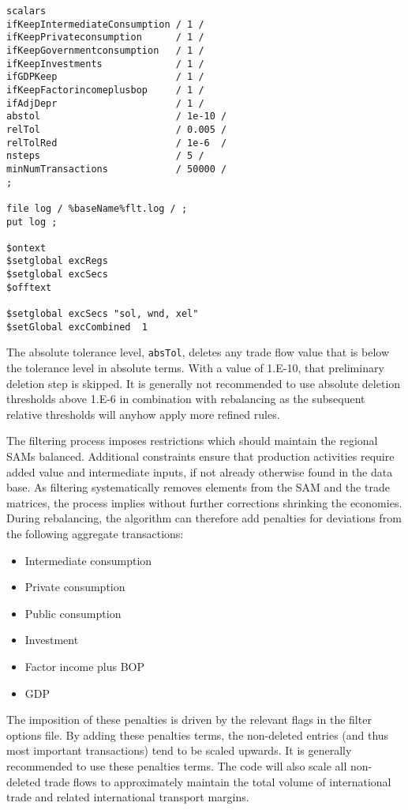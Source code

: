 \begin{lstlisting}[language=GAMS,
      caption={An example of a filter file}, label=lst:fltFile]
scalars
ifKeepIntermediateConsumption / 1 /
ifKeepPrivateconsumption      / 1 /
ifKeepGovernmentconsumption   / 1 /
ifKeepInvestments             / 1 /
ifGDPKeep                     / 1 /
ifKeepFactorincomeplusbop     / 1 /
ifAdjDepr                     / 1 /
abstol                        / 1e-10 /
relTol                        / 0.005 /
relTolRed                     / 1e-6  /
nsteps                        / 5 /
minNumTransactions            / 50000 /
;

file log / %baseName%flt.log / ;
put log ;

$ontext
$setglobal excRegs
$setglobal excSecs
$offtext

$setglobal excSecs "sol, wnd, xel"
$setGlobal excCombined  1
\end{lstlisting}

The absolute tolerance level, \texttt{absTol}, deletes any trade flow value that
is below the tolerance level in absolute terms. With a value of 1.E-10, that
preliminary deletion step is skipped. It is generally not recommended to use
absolute deletion thresholds above 1.E-6 in combination with rebalancing as the
subsequent relative thresholds will anyhow apply more refined rules.

The filtering process imposes restrictions which should maintain the regional
SAMs balanced. Additional constraints ensure that production activities require
added value and intermediate inputs, if not already otherwise found in the data
base. As filtering systematically removes elements from the SAM and the trade
matrices, the process implies without further corrections shrinking the
economies. During rebalancing, the algorithm can therefore add penalties for
deviations from the following aggregate transactions:

\begin{itemize}
   \item Intermediate consumption
   \item Private consumption
   \item Public consumption
   \item Investment
   \item Factor income plus BOP
   \item GDP
\end{itemize}

\noindent The imposition of these penalties is driven by the relevant flags in
the filter options file. By adding these penalties terms, the non-deleted
entries (and thus most important transactions) tend to be scaled upwards. It is
generally recommended to use these penalties terms. The code will also scale all
non-deleted trade flows to approximately maintain the total volume of
international trade and related international transport margins.

